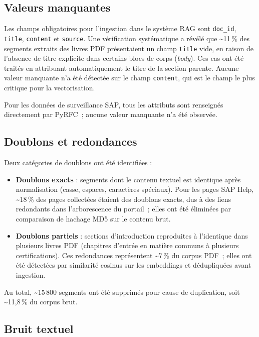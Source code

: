 \subsection{Valeurs manquantes}

Les champs obligatoires pour l’ingestion dans le système RAG sont \texttt{doc\_id}, \texttt{title}, \texttt{content} et \texttt{source}. Une vérification systématique a révélé que \textasciitilde{}11\,\% des segments extraits des livres PDF présentaient un champ \texttt{title} vide, en raison de l’absence de titre explicite dans certains blocs de corps (\textit{body}). Ces cas ont été traités en attribuant automatiquement le titre de la section parente. Aucune valeur manquante n’a été détectée sur le champ \texttt{content}, qui est le champ le plus critique pour la vectorisation.

Pour les données de surveillance SAP, tous les attributs sont renseignés directement par PyRFC~; aucune valeur manquante n’a été observée.

\subsection{Doublons et redondances}

Deux catégories de doublons ont été identifiées :

\begin{itemize}
    \item \textbf{Doublons exacts} : segments dont le contenu textuel est identique après normalisation (casse, espaces, caractères spéciaux). Pour les pages SAP Help, \textasciitilde{}18\,\% des pages collectées étaient des doublons exacts, dus à des liens redondants dans l’arborescence du portail~; elles ont été éliminées par comparaison de hachage MD5 sur le contenu brut.
    \item \textbf{Doublons partiels} : sections d’introduction reproduites à l’identique dans plusieurs livres PDF (chapitres d’entrée en matière communs à plusieurs certifications). Ces redondances représentent \textasciitilde{}7\,\% du corpus PDF~; elles ont été détectées par similarité cosinus sur les embeddings et dédupliquées avant ingestion.
\end{itemize}

Au total, \textasciitilde{}15\,800 segments ont été supprimés pour cause de duplication, soit \textasciitilde{}11,8\,\% du corpus brut.

\subsection{Bruit textuel}

